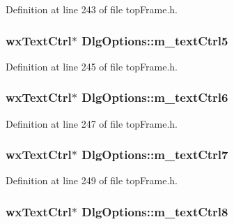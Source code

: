 Definition at line 243 of file top\-Frame.\-h.

\hypertarget{class_dlg_options_aef875e819d6e463b985859b319f4197f}{
\subsubsection[{m\-\_\-text\-Ctrl5}]{\setlength{\rightskip}{0pt plus 5cm}wx\-Text\-Ctrl$\ast$ Dlg\-Options\-::m\-\_\-text\-Ctrl5\hspace{0.3cm}{\ttfamily [protected]}}}\label{class_dlg_options_aef875e819d6e463b985859b319f4197f}


Definition at line 245 of file top\-Frame.\-h.

\hypertarget{class_dlg_options_a43f9a8d2714f7f5d8de2eada66d0f829}{
\subsubsection[{m\-\_\-text\-Ctrl6}]{\setlength{\rightskip}{0pt plus 5cm}wx\-Text\-Ctrl$\ast$ Dlg\-Options\-::m\-\_\-text\-Ctrl6\hspace{0.3cm}{\ttfamily [protected]}}}\label{class_dlg_options_a43f9a8d2714f7f5d8de2eada66d0f829}


Definition at line 247 of file top\-Frame.\-h.

\hypertarget{class_dlg_options_adba9ce87076479d390d32932f5c71a7c}{
\subsubsection[{m\-\_\-text\-Ctrl7}]{\setlength{\rightskip}{0pt plus 5cm}wx\-Text\-Ctrl$\ast$ Dlg\-Options\-::m\-\_\-text\-Ctrl7\hspace{0.3cm}{\ttfamily [protected]}}}\label{class_dlg_options_adba9ce87076479d390d32932f5c71a7c}


Definition at line 249 of file top\-Frame.\-h.

\hypertarget{class_dlg_options_acaed1591a5e35a2750f610644cc90f29}{
\subsubsection[{m\-\_\-text\-Ctrl8}]{\setlength{\rightskip}{0pt plus 5cm}wx\-Text\-Ctrl$\ast$ Dlg\-Options\-::m\-\_\-text\-Ctrl8\hspace{0.3cm}{\ttfamily [protected]}}}\label{class_dlg_options_acaed1591a5e35a2750f610644cc90f29}


